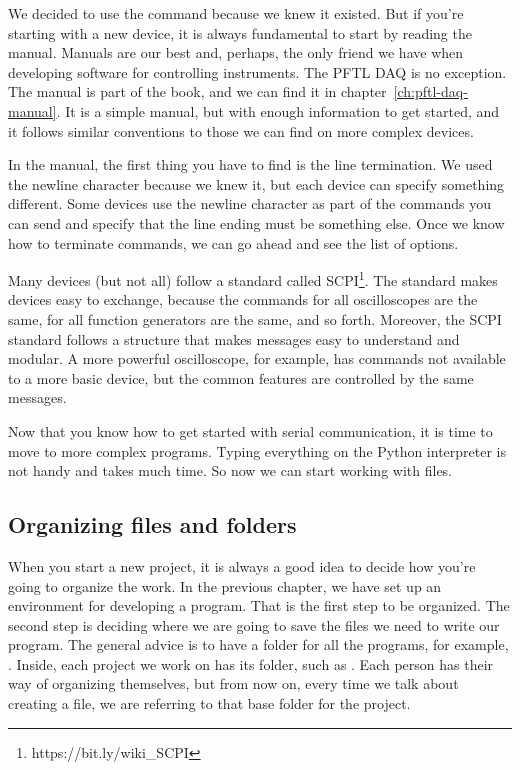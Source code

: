 We decided to use the  command because we knew it existed. But if you're starting with a new device, it is always fundamental to start by reading the manual. Manuals are our best and, perhaps, the only friend we have when developing software for controlling instruments. The {PFTL DAQ} is no exception. The manual is part of the book, and we can find it in chapter~\ref{ch:pftl-daq-manual}. It is a simple manual, but with enough information to get started, and it follows similar conventions to those we can find on more complex devices.

In the manual, the first thing you have to find is the line termination. We used the newline character because we knew it, but each device can specify something different. Some devices use the newline character as part of the commands you can send and specify that the line ending must be something else. Once we know how to terminate commands, we can go ahead and see the list of options.

Many devices (but not all) follow a standard called SCPI\footnote{https://bit.ly/wiki\_SCPI}. The standard makes devices easy to exchange, because the commands for all oscilloscopes are the same, for all function generators are the same, and so forth. Moreover, the SCPI standard follows a structure that makes messages easy to understand and modular. A more powerful oscilloscope, for example, has commands not available to a more basic device, but the common features are controlled by the same messages.

Now that you know how to get started with serial communication, it is time to move to more complex programs. Typing everything on the Python interpreter is not handy and takes much time. So now we can start working with files.

\subsection{Organizing files and folders}\label{subsec:organizing-files-and-folders}
When you start a new project, it is always a good idea to decide how you're going to organize the work. In the previous chapter, we have set up an environment for developing a program. That is the first step to be organized. The second step is deciding where we are going to save the files we need to write our program. The general advice is to have a folder for all the programs, for example, . Inside, each project we work on has its folder, such as . Each person has their way of organizing themselves, but from now on, every time we talk about creating a file, we are referring to that base folder for the project.

